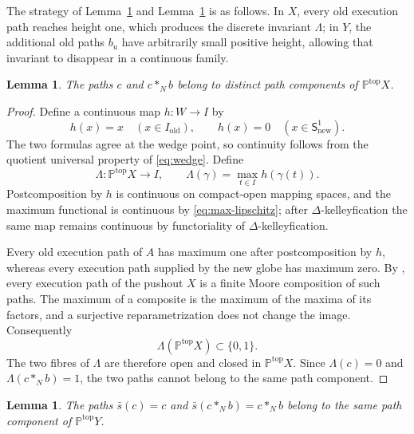 \documentclass[12pt,a4paper]{amsart}
\newcommand{\Path}{\mathbb P^{\mathrm{top}}}
\newtheorem{lemma}[theorem]{Lemma}
\theoremstyle{definition}
\begin{document}
The strategy of Lemma~\ref{lem:separated} and Lemma~\ref{lem:connected} is as follows. In \(X\), every old execution path reaches height one, which produces the discrete invariant \(\Lambda\); in \(Y\), the additional old paths \(b_u\) have arbitrarily small positive height, allowing that invariant to disappear in a continuous family.

\begin{lemma}\label{lem:separated}
The paths \(c\) and \(c*_N b\) belong to distinct path components of \(\Path X\).
\end{lemma}

\begin{proof}
Define a continuous map \(h: W\to I\) by
\[
 h(x)=x\quad(x\in I_{\mathrm{old}}),
 \qquad
 h(x)=0\quad(x\in \mathsf{S}^1_{\mathrm{new}}).
\]
The two formulas agree at the wedge point, so continuity follows from the quotient universal property of \eqref{eq:wedge}.  Define
\[
 \Lambda:\Path X\longrightarrow I,
 \qquad
 \Lambda(\gamma)=\max_{t\in I}h(\gamma(t)).
\]
Postcomposition by \(h\) is continuous on compact-open mapping spaces, and the maximum functional is continuous by \eqref{eq:max-lipschitz}; after \(\Delta\)-kelleyfication the same map remains continuous by functoriality of \(\Delta\)-kelleyfication.

Every old execution path of \(A\) has maximum one after postcomposition by \(h\), whereas every execution path supplied by the new globe has maximum zero.  By \cite[Theorem~2]{Moore3}, every execution path of the pushout \(X\) is a finite Moore composition of such paths.  The maximum of a composite is the maximum of the maxima of its factors, and a surjective reparametrization does not change the image.  Consequently
\[
 \Lambda(\Path X)\subset\{0,1\}.
\]
The two fibres of \(\Lambda\) are therefore open and closed in \(\Path X\). Since \(\Lambda(c)=0\) and \(\Lambda(c*_N b)=1\), the two paths cannot belong to the same path component.
\end{proof}

\begin{lemma}\label{lem:connected}
The paths \(\bar s(c)=c\) and \(\bar s(c*_N b)=c*_N b\) belong to the same path component of \(\Path Y\).
\end{lemma}
\end{document}
